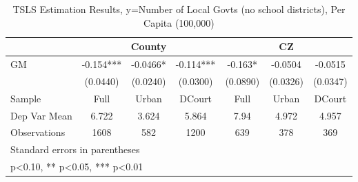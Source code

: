 \begin{table}[htbp]\centering
\def\sym#1{\ifmmode^{#1}\else\(^{#1}\)\fi}
\caption{TSLS Estimation Results, y=Number of Local Govts (no school districts), Per Capita (100,000)}
\begin{tabular}{l*{6}{c}}
\toprule
                &\multicolumn{3}{c}{County}            &\multicolumn{3}{c}{CZ}                \\\cmidrule(lr){2-4}\cmidrule(lr){5-7}
\midrule
GM              &   -0.154***&  -0.0466*  &   -0.114***&   -0.163*  &  -0.0504   &  -0.0515   \\
                & (0.0440)   & (0.0240)   & (0.0300)   & (0.0890)   & (0.0326)   & (0.0347)   \\
\midrule
Sample          &     Full   &    Urban   &   DCourt   &     Full   &    Urban   &   DCourt   \\
Dep Var Mean    &    6.722   &    3.624   &    5.864   &     7.94   &    4.972   &    4.957   \\
Observations    &     1608   &      582   &     1200   &      639   &      378   &      369   \\
\bottomrule
\multicolumn{7}{l}{\footnotesize Standard errors in parentheses}\\
\multicolumn{7}{l}{\footnotesize * p<0.10, ** p<0.05, *** p<0.01}\\
\end{tabular}
\end{table}

